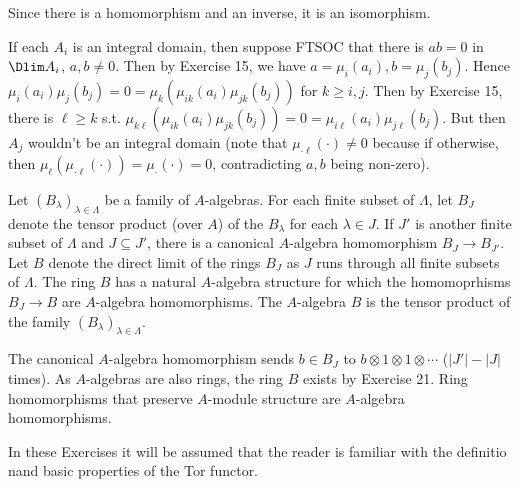 \documentclass[a4paper]{exam}
\begin{document}
\begin{questions}
\begin{solution}
		Since there is a homomorphism and an inverse, it is an isomorphism.

		If each $A_i $ is an integral domain, then suppose FTSOC that there is $ab = 0 $ in $\Dlim A_i $, $a,b\ne 0 $.
		Then by Exercise 15, we have $a = \mu_i(a_i),b=\mu_j(b_j)$.
		Hence $\mu _i(a_i)\mu _j(b_j) = 0 = \mu _k(\mu _{ik}(a_i)\mu _{jk}(b_j)) $ for $k\ge i,j $.
		Then by Exercise 15, there is $\ell\ge k $ s.t. $\mu _{k\ell}(\mu _{ik}(a_i)\mu _{jk}(b_j)) = 0 = \mu _{i\ell}(a_i)\mu _{j\ell}(b_j) $.
		But then $A_j $ wouldn't be an integral domain (note that $\mu _{\cdot \ell}(\cdot) \ne 0 $ because if otherwise, then $\mu _\ell(\mu _{\cdot \ell}(\cdot)) = \mu_{\cdot}(\cdot) = 0$, contradicting $a,b $ being non-zero).
	\end{solution}

	\question Let $(B_{\lambda })_{\lambda \in \Lambda} $ be a family of $A $-algebras. For each finite subset of $\Lambda $, let $B_J $ denote the tensor product (over $A $) of the $B_{\lambda} $ for each $\lambda \in J $. If $J' $ is another finite subset of $\Lambda $ and $J\subseteq J' $, there is a canonical $A $-algebra homomorphism $B_J\to B_{J'} $. Let $B $ denote the direct limit of the rings $B_J $ as $J $ runs through all finite subsets of $\Lambda $. The ring $B $ has a natural $A $-algebra structure for which the homomoprhisms $B_J\to B $ are $A$-algebra homomorphisms. The $A $-algebra $B $ is the tensor product of the family $(B_{\lambda})_{\lambda\in \Lambda} $.
	\begin{solution}
		The canonical $A $-algebra homomorphism sends $b\in B_J $ to $b \otimes 1 \otimes 1 \otimes \cdots $ ($|J'| - |J| $ times).
		As $A $-algebras are also rings, the ring $B $ exists by Exercise 21.
		Ring homomorphisms that preserve $A $-module structure are $A $-algebra homomorphisms.
	\end{solution}

	\question In these Exercises it will be assumed that the reader is familiar with the definitio nand basic properties of the Tor functor.


\end{questions}
\end{document}
